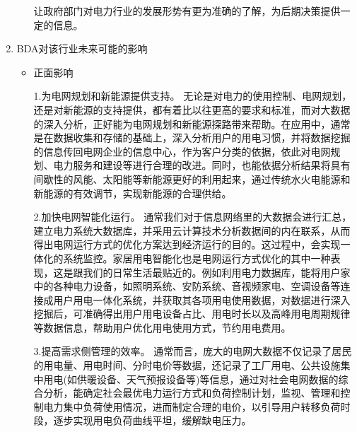 \documentclass{article}
\begin{document}
\begin{enumerate}
\begin{enumerate}
让政府部门对电力行业的发展形势有更为准确的了解，为后期决策提供一定的信息。
  \end{enumerate}
  
  \item BDA对该行业未来可能的影响\par 
    \begin{itemize}
        \item 正面影响 \par
        \hspace{2em} 1.为电网规划和新能源提供支持。
   无论是对电力的使用控制、电网规划，还是对新能源的支持提供，都有着比以往更高的要求和标准，而对大数据的深入分析，正好能为电网规划和新能源探路带来帮助。在应用中，通常是在数据收集和存储的基础上，深入分析用户的用电习惯，并将数据挖掘的信息传回电网企业的信息中心，作为客户分类的依据，依此对电网规划、电力服务和建设等进行合理的改进。同时，也能依据分析结果将具有间歇性的风能、太阳能等新能源更好的利用起来，通过传统水火电能源和新能源的有效调节，实现新能源的合理供给。 \par
        \hspace{2em} 2.加快电网智能化运行。
   通常我们对于信息网络里的大数据会进行汇总，建立电力系统大数据库，并采用云计算技术分析数据间的内在联系，从而得出电网运行方式的优化方案达到经济运行的目的。这过程中，会实现一体化的系统监控。家居用电智能化也是电网运行方式优化的其中一种表现，这是跟我们的日常生活最贴近的。例如利用电力数据库，能将用户家中的各种电力设备，如照明系统、安防系统、音视频家电、空调设备等连接成用户用电一体化系统，并获取其各项用电使用数据，对数据进行深入挖掘后，可准确得出用户用电设备占比、用电时长以及高峰用电周期规律等数据信息，帮助用户优化用电使用方式，节约用电费用。  \par
        \hspace{2em} 3.提高需求侧管理的效率。
    通常而言，庞大的电网大数据不仅记录了居民的用电量、用电时间、分时电价等数据，还记录了工厂用电、公共设施集中用电(如供暖设备、天气预报设备等)等信息，通过对社会电网数据的综合分析，能确定社会最优电力运行方式和负荷控制计划，监视、管理和控制电力集中负荷使用情况，进而制定合理的电价，以引导用户转移负荷时段，逐步实现用电负荷曲线平坦，缓解缺电压力。


\end{itemize}
\end{enumerate}
\end{document}
